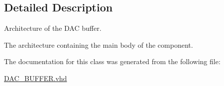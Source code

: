 \subsection{Detailed Description}
Architecture of the D\-A\-C buffer. 

The architecture containing the main body of the component. 

The documentation for this class was generated from the following file\-:\begin{DoxyCompactItemize}
\item 
\hyperlink{DAC__BUFFER_8vhd}{D\-A\-C\-\_\-\-B\-U\-F\-F\-E\-R.\-vhd}\end{DoxyCompactItemize}
